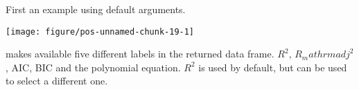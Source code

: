 \documentclass[paper=a4,10pt,div=17,headsepline,BCOR=12mm,twoside,open=right]{scrbook}\usepackage{knitr}
\begin{document}
\begin{knitrout}\footnotesize
{}\color{fgcolor}\begin{kframe}
\begin{alltt}
\hlstd{(}\hlstd{)}
 \hlkwb{<-} \hlopt{:}
 \hlkwb{<-}  \hlopt{+} \hlopt{^} \hlopt{+} \hlopt{^}\hlstd{)} \hlopt{+}
  \hlstd{(}  \hlstd{=} \hlstd{,}  \hlstd{=} \hlopt{^}\hlstd{)} \hlopt{/} \hlstd{)}
 \hlkwb{<-} 
                       \hlstd{=} \hlstd{(}\hlstd{,} \hlstd{),}
                        \hlopt{*} \hlstd{(}\hlstd{,}\hlstd{))}
\end{alltt}
\end{kframe}
\end{knitrout}

First an example using default arguments.

\begin{knitrout}\footnotesize
{}\color{fgcolor}\begin{kframe}
\begin{alltt}
 \hlkwb{<-}  \hlopt{~}  \hlstd{,}  \hlstd{=} \hlstd{)}
  \hlopt{+}
  \hlstd{()} \hlopt{+}
  \hlstd{(} \hlstd{=} \hlstd{,}   \hlopt{+}
  \hlstd{(}   \hlstd{=} \hlstd{)}
\end{alltt}
\end{kframe}

{\centering \texttt{[image: figure/pos-unnamed-chunk-19-1]} 

}



\end{knitrout}

 makes available five different labels in the returned data frame. $R^2$, $R_mathrm{adj}^2$, AIC, BIC and the polynomial equation. $R^2$ is used by default, but  can be used to select a different one.
\end{document}
